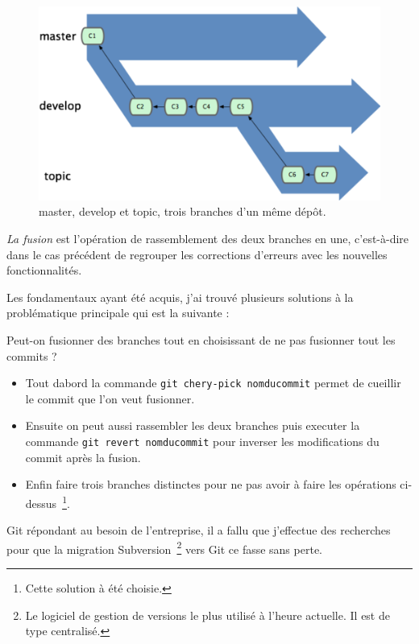 \begin{figure}
\begin{center}
\includegraphics[scale=0.8]{images/branches.png}
\caption{master, develop et topic, trois branches d'un même dépôt.}
\label{branches:}
\end{center}
\end{figure}

\emph{La fusion} est l'opération de rassemblement des deux branches en une,
c'est-à-dire dans le cas précédent de regrouper les corrections d'erreurs avec
les nouvelles fonctionnalités.

Les fondamentaux ayant été acquis, j'ai trouvé plusieurs solutions à la
problématique principale qui est la suivante : \newline

Peut-on fusionner des branches tout en choisissant de ne pas fusionner
tout les commits ? \newline

\begin{itemize}
    \item Tout dabord la commande \texttt{git chery-pick nomducommit} permet
    de \og cueillir \fg{} le commit que l'on veut fusionner.
    \item Ensuite on peut aussi rassembler les deux branches puis executer la
    commande \texttt{git revert nomducommit} pour inverser les modifications
    du commit après la fusion.
    \item Enfin faire trois branches distinctes pour ne pas avoir à faire les
    opérations ci-dessus\, \footnote{Cette solution à été choisie.}.
\end{itemize}

Git répondant au besoin de l'entreprise, il a fallu que j'effectue des
recherches pour que la migration Subversion\, \footnote{Le logiciel de gestion
de versions le plus utilisé à l'heure actuelle. Il est de type centralisé.}
vers Git ce fasse sans perte.

